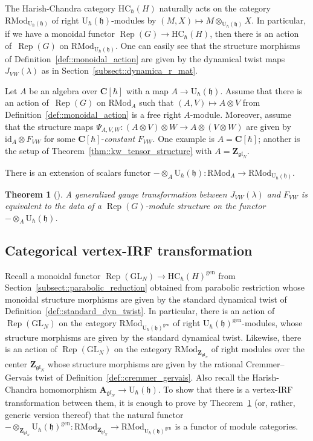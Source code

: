 \documentclass[10pt,a4paper]{amsart}
\numberwithin{equation}{section}
\newtheorem{Theorem}{Theorem}[section]
\newcommand{\C}{\mathbf{C}}
\newcommand{\U}{\mathrm{U}_{\hbar}}
\newcommand{\Z}{\mathbf{Z}}
\newcommand{\A}{\mathbf{A}}
\newcommand{\GL}{\mathrm{GL}}
\newcommand{\h}{\mathfrak{h}}
\newcommand{\gen}{\mathrm{gen}}
\newcommand{\HC}{\mathrm{HC}_{\hbar}}
\newcommand{\id}{\mathrm{id}}
\newcommand{\RMod}{\mathrm{RMod}}
\DeclareMathOperator{\Rep}{Rep}
\newcommand{\gl}{\mathfrak{gl}}
\begin{document}
	The Harish-Chandra category $\HC(H)$ naturally acts on the category $\RMod_{\U(\h)}$ of right $\U(\h)$-modules by
	$
	(M,X) \mapsto M \otimes_{\U(\h)} X$.
	In particular, if we have a monoidal functor $\Rep(G) \rightarrow \HC(H)$, then there is an action of~$\Rep(G)$ on $\RMod_{\U(\h)}$. One can easily see that the structure morphisms of Definition~\ref{def::monoidal_action} are given by the dynamical twist maps $J_{VW}(\lambda)$ as in Section~\ref{subsect::dynamica_r_mat}.
	
	Let $A$ be an algebra over $\C[\hbar]$ with a map $A\rightarrow \U(\h)$. Assume that there is an action of~$\Rep(G)$ on $\RMod_{A}$ such that $(A,V) \mapsto A \otimes V$ from Definition~\ref{def::monoidal_action} is a free right $A$-module. Moreover, assume that the structure maps $\Psi_{A,V,W}\colon (A \otimes V) \otimes W \rightarrow A \otimes (V \otimes W)$ are given by $\id_A \otimes F_{VW}$ for some $\C[\hbar]$-\emph{constant} $F_{VW}$. One example is $A=\C[\hbar]$; another is the setup of Theorem~\ref{thm::kw_tensor_structure} with $A = \Z_{\gl_N}$.
	
	There is an extension of scalars functor $- \otimes_A \U(\h) \colon \RMod_{A} \rightarrow \RMod_{\U(\h)}$.
	\begin{Theorem}[{\cite[Proposition 2.4.3]{Kalmykov}}]
		\label{thm::vertex-irf}
		A generalized gauge transformation between $J_{VW}(\lambda)$ and $F_{VW}$ is equivalent to the data of a $\Rep(G)$-module structure on the functor $-\otimes_A \U(\h)$.
	\end{Theorem}
	
	\subsection{Categorical vertex-IRF transformation}
	
	Recall a monoidal functor $\Rep(\GL_N) \rightarrow \HC(H)^{\gen}$ from Section~\ref{subsect::parabolic_reduction} obtained from parabolic restriction whose monoidal structure morphisms are given by the standard dynamical twist of Definition~\ref{def::standard_dyn_twist}. In particular, there is an action of $\Rep(\GL_N)$ on the category $\RMod_{\U(\h)^{\gen}}$ of right $\U(\h)^{\gen}$-modules, whose structure morphisms are given by the standard dynamical twist. Likewise, there is an action of $\Rep(\GL_N)$ on the category $\RMod_{\Z_{\gl_N}}$ of right modules over the center $\Z_{\gl_N}$ whose structure morphisms are given by the rational Cremmer--Gervais twist of Definition~\ref{def::cremmer_gervais}. Also recall the Harish-Chandra homomorphism $\A_{\gl_{N}} \rightarrow \U(\h)$. To show that there is a vertex-IRF transformation between them, it is enough to prove by Theorem~\ref{thm::vertex-irf} (or, rather, generic version thereof) that the natural functor $- \otimes_{\Z_{\gl_N}} \U(\h)^{\gen}\colon \RMod_{\Z_{\gl_N}} \rightarrow \RMod_{\U(\h)^{\gen}}$ is a functor of module categories.
	
\end{document}
